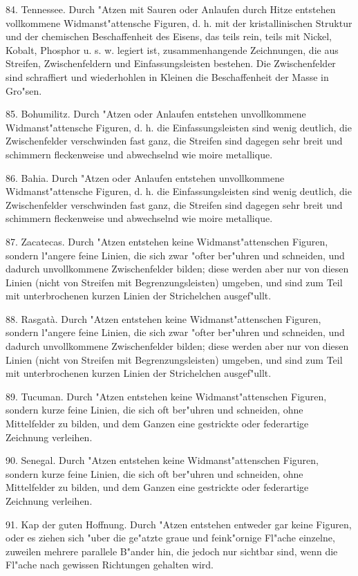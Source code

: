 \documentclass[a4paper, 11pt, oneside, polutonikogreek, german]{article}
\begin{document}
84. Tennessee. Durch "Atzen mit Sauren oder Anlaufen durch Hitze entstehen vollkommene Widmanst"attensche Figuren, d. h. mit der kristallinischen Struktur und der chemischen Beschaffenheit des Eisens, das teils rein, teils mit Nickel, Kobalt, Phosphor u. s. w. legiert ist, zusammenhangende Zeichnungen, die aus Streifen, Zwischenfeldern und Einfassungsleisten bestehen. Die Zwischenfelder sind schraffiert und wiederhohlen in Kleinen die Beschaffenheit der Masse in Gro"sen.

85. Bohumilitz. Durch "Atzen oder Anlaufen entstehen unvollkommene Widmanst"attensche Figuren, d. h. die Einfassungsleisten sind wenig deutlich, die Zwischenfelder verschwinden fast ganz, die Streifen sind dagegen sehr breit und schimmern fleckenweise und abwechselnd wie moire metallique.

86. Bahia. Durch "Atzen oder Anlaufen entstehen unvollkommene Widmanst"attensche Figuren, d. h. die Einfassungsleisten sind wenig deutlich, die Zwischenfelder verschwinden fast ganz, die Streifen sind dagegen sehr breit und schimmern fleckenweise und abwechselnd wie moire metallique.

87. Zacatecas. Durch "Atzen entstehen keine Widmanst"attenschen Figuren, sondern l"angere feine Linien, die sich zwar "ofter ber"uhren und schneiden, und dadurch unvollkommene Zwischenfelder bilden; diese werden aber nur von diesen Linien (nicht von Streifen mit Begrenzungsleisten) umgeben, und sind zum Teil mit unterbrochenen kurzen Linien der Strichelchen ausgef"ullt.

88. Rasgatà. Durch "Atzen entstehen keine Widmanst"attenschen Figuren, sondern l"angere feine Linien, die sich zwar "ofter ber"uhren und schneiden, und dadurch unvollkommene Zwischenfelder bilden; diese werden aber nur von diesen Linien (nicht von Streifen mit Begrenzungsleisten) umgeben, und sind zum Teil mit unterbrochenen kurzen Linien der Strichelchen ausgef"ullt.

89. Tucuman. Durch "Atzen entstehen keine Widmanst"attenschen Figuren, sondern kurze feine Linien, die sich oft ber"uhren und schneiden, ohne Mittelfelder zu bilden, und dem Ganzen eine gestrickte oder federartige Zeichnung verleihen.

90. Senegal. Durch "Atzen entstehen keine Widmanst"attenschen Figuren, sondern kurze feine Linien, die sich oft ber"uhren und schneiden, ohne Mittelfelder zu bilden, und dem Ganzen eine gestrickte oder federartige Zeichnung verleihen.

91. Kap der guten Hoffnung. Durch "Atzen entstehen entweder gar keine Figuren, oder es ziehen sich "uber die ge"atzte graue und feink"ornige Fl"ache einzelne, zuweilen mehrere parallele B"ander hin, die jedoch nur sichtbar sind, wenn die Fl"ache nach gewissen Richtungen gehalten wird.
\end{document}
